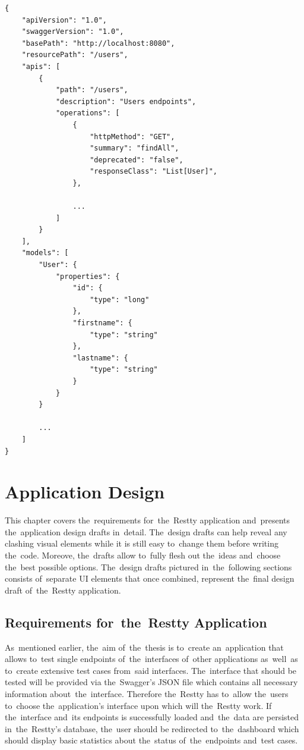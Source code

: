 \vspace{1mm}
\begin{lstlisting}[caption=An~example of~API documentation in~JSON format
created using the~Swagger framework., style=dp-default, label=lst-swagger-json]
{
	"apiVersion": "1.0",
	"swaggerVersion": "1.0",
	"basePath": "http://localhost:8080",
	"resourcePath": "/users",
	"apis": [
		{
			"path": "/users",
			"description": "Users endpoints",
			"operations": [
				{
					"httpMethod": "GET",
					"summary": "findAll",
					"deprecated": "false",
					"responseClass": "List[User]", 
				},
				
				... 
			]
		}
	],
	"models": [
		"User": {
			"properties": {
				"id": {
					"type": "long"
				},
				"firstname": {
					"type": "string"
				},
				"lastname": {
					"type": "string"
				}
			}
		}
		
		...	
	]
}
\end{lstlisting}
  





\chapter{Application Design}
\label{Design}
This chapter covers the~requirements for~the~Restty application and~presents
the~application design drafts in~detail. The~design drafts can help reveal any
clashing visual elements while it is still easy to~change them before writing
the~code. Moreove, the~drafts allow to~fully flesh out the~ideas and~choose
the~best possible options. The~design drafts pictured in~the~following sections
consists of~separate UI elements that once combined, represent the~final design
draft of~the~Restty application.


\section{Requirements for~the~Restty Application}
As~mentioned earlier, the~aim of~the~thesis is to~create an~application that
allows to~test single endpoints of~the~interfaces of~other applications
as~well~as to~create extensive test cases from~said interfaces. The~interface
that should be tested will be provided via the~Swagger's JSON file which
contains all necessary information about~the~interface. Therefore the~Restty has
to~allow the~users to~choose the~application's interface upon which will
the~Restty work. If the~interface and~its endpoints is successfully loaded
and~the~data are persisted in~the~Restty's database, the~user should be
redirected to~the~dashboard which should display basic statistics about
the~status of~the~endpoints and~test cases.


